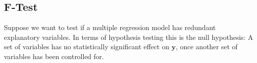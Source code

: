 


\subsection{F-Test}\label{sec:Ftest}
Suppose we want to test if a multiple regression model has redundant explanatory variables.
In terms of hypothesis testing this is the null hypothesis: A set of variables has no statistically significant effect on $\textbf{y}$, once another set of variables has been controlled for.

